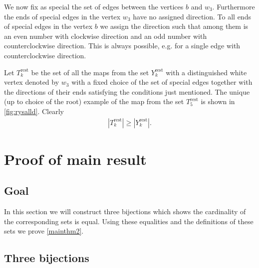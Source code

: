 \documentclass[submission]{FPSAC2021}
\DeclareMathOperator{\rest}{rest}
\begin{document}
We now fix as special the set of edges between 
the vertices $b$ and $w_3$.
Furthermore the ends of special edges in the
vertex $w_3$ have no assigned direction. 
To all ends of special edges in the vertex 
$b$ we assign the direction such that among 
them is an even number with clockwise direction 
and an odd number with counterclockwise direction.
This is always possible, e.g. for a single edge 
with counterclockwise direction.

Let $T_k^{\rest}$ be the set of all the 
maps from the set $Y_k^{\rest}$ with a 
distinguished white vertex denoted by $w_3$ 
with a fixed choice of the set of special 
edges together with the directions of their 
ends satisfying the conditions just mentioned. 
The unique (up to choice of the root) example 
of the map from the set $T_{5}^{\rest}$ is 
shown in \cref{fig:rysalld}. Clearly
\begin{align}
\label{ineqrest}
|T_{k}^{\rest}| \geq |Y_{k}^{\rest}|.
\end{align}


\section{Proof of main result}

\subsection{Goal}
In this section we will construct three bijections 
which shows the cardinality of the corresponding sets 
is equal. Using these equalities and the definitions 
of these sets we prove \cref{mainthm2}.

\subsection{Three bijections}
\end{document}
